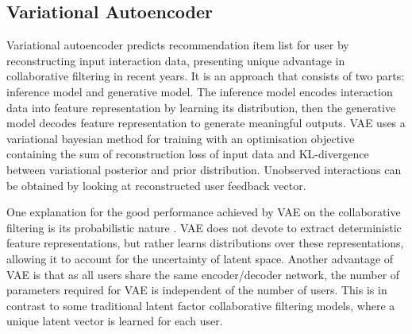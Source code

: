 \subsection{Variational Autoencoder }\label{subsec2}
Variational autoencoder \cite{DBLP:journals/corr/KingmaW13, DBLP:conf/www/LiangKHJ18,DBLP:conf/wsdm/WuDZE16} predicts recommendation item list for user by reconstructing input interaction data, presenting unique advantage in collaborative filtering in recent years. It is an approach that consists of two parts: inference model and generative model. The inference model encodes interaction data into feature representation by learning its distribution, then the generative model decodes feature representation to generate meaningful outputs. VAE uses a variational bayesian method for training with an optimisation objective containing the sum of reconstruction loss of input data and KL-divergence between variational posterior and prior distribution. Unobserved interactions can be obtained by looking at reconstructed user feedback vector.

One explanation for the good performance achieved by VAE on the collaborative filtering is its probabilistic nature \cite{DBLP:conf/wsdm/TruongSL21}. VAE does not devote to extract deterministic feature representations, but rather learns distributions over these representations, allowing it to account for the uncertainty of latent space. Another advantage of VAE is that as all users share the same encoder/decoder network, the number of parameters required for VAE is independent of the number of users. \cite{DBLP:conf/iclr/LobelLGC20} This is in contrast to some traditional latent factor collaborative filtering models, where a unique latent vector is learned for each user.


